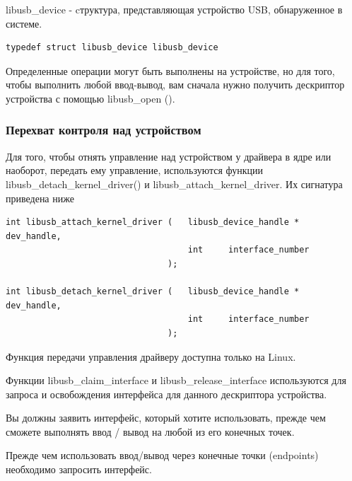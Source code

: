 \documentclass[14pt,a4paper]{article}
\begin{document}
\par libusb\_device - cтруктура, представляющая устройство USB, обнаруженное в системе.

\begin{lstlisting}[language=c caption={}]
typedef struct libusb_device libusb_device
\end{lstlisting}

\par Определенные операции могут быть выполнены на устройстве, но для того, чтобы выполнить любой ввод-вывод, вам сначала нужно получить дескриптор устройства с помощью libusb\_open ().\\

\subsubsection{Перехват контроля над устройством}

\par Для того, чтобы отнять управление над устройством у драйвера в ядре или наоборот, передать ему управление, используются функции libusb\_detach\_kernel\_driver() и libusb\_attach\_kernel\_driver. Их сигнатура приведена ниже 

\begin{lstlisting}[language=c caption={Подключение/отключение драйвера}]
int libusb_attach_kernel_driver	(	libusb_device_handle * 	dev_handle,
                                    int 	interface_number 
                                );
                                
int libusb_detach_kernel_driver	(	libusb_device_handle * 	dev_handle,
                                    int 	interface_number 
                                );
\end{lstlisting}

Функция передачи управления драйверу доступна только на Linux.\\

\par Функции libusb\_claim\_interface и libusb\_release\_interface используются для запроса и освобождения интерфейса для данного дескриптора устройства.

\par Вы должны заявить интерфейс, который хотите использовать, прежде чем сможете выполнять ввод / вывод на любой из его конечных точек.\\

\par Прежде чем использовать ввод/вывод через конечные точки (endpoints) необходимо запросить интерфейс.\\
\end{document}

